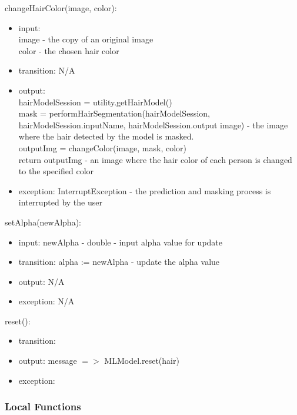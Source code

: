 \documentclass[12pt, titlepage]{article}
\begin{document}
\noindent changeHairColor(image, color):
\begin{itemize}
\item input: \\ image - the copy of an original image \\ color - the chosen hair color
\item transition: N/A
\item output:\\
hairModelSession = utility.getHairModel() \\
mask = performHairSegmentation(hairModelSession, hairModelSession.inputName, hairModelSession.output image) - the image where the hair detected by the model is masked. \\
outputImg = changeColor(image, mask, color) \\
return outputImg - an image where the hair color of each person is changed to the specified color
\item exception: InterruptException - the prediction and masking process is interrupted by the user
\end{itemize}

\noindent setAlpha(newAlpha):
\begin{itemize}
\item input: newAlpha - double - input alpha value for update
\item transition: alpha := newAlpha - update the alpha value
\item output: N/A
\item exception: N/A
\end{itemize}

\noindent reset():
\begin{itemize}
\item transition:
\item output: message $=>$ MLModel.reset(hair)
\item exception: 
\end{itemize}

\subsubsection{Local Functions}
\end{document}
